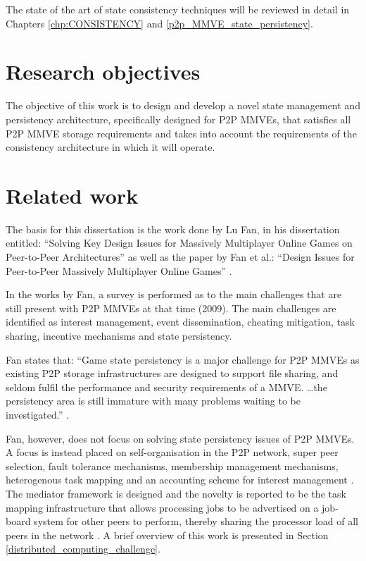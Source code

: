 The state of the art of state consistency techniques will be reviewed in detail in Chapters \ref{chp:CONSISTENCY} and \ref{p2p_MMVE_state_persistency}.

\section{Research objectives}

The objective of this work is to design and develop a novel state management and persistency architecture, specifically designed for P2P MMVEs, that satisfies all P2P MMVE storage requirements and takes into account the requirements of the consistency architecture in which it will operate.

\section{Related work}

The basis for this dissertation is the work done by Lu Fan, in his dissertation entitled: ``Solving Key Design Issues for Massively Multiplayer Online Games on Peer-to-Peer Architectures'' \cite{Fan_phd} as well as the paper by Fan et al.: ``Design Issues for Peer-to-Peer Massively Multiplayer Online Games'' \cite{Fan_deisgn_issues_p2p}.

In the works by Fan, a survey is performed as to the main challenges that are still present with P2P MMVEs at that time (2009). The main challenges are identified as interest management, event dissemination, cheating mitigation, task sharing, incentive mechanisms and state persistency.

Fan states that: ``Game state persistency is a major challenge for P2P MMVEs as existing P2P storage infrastructures are designed to support file sharing, and seldom fulfil the performance and security requirements of a MMVE. \ldots the persistency area is still immature with many problems waiting to be investigated.'' \cite{Fan_phd}.

Fan, however, does not focus on solving state persistency issues of P2P MMVEs. A focus is instead placed on self-organisation in the P2P network, super peer selection, fault tolerance mechanisms, membership management mechanisms, heterogenous task mapping and an accounting scheme for interest management \cite{Fan_phd}. The mediator framework is designed and the novelty is reported to be the task mapping infrastructure that allows processing jobs to be advertised on a job-board system for other peers to perform, thereby sharing the processor load of all peers in the network \cite{fan_mediator_paper}. A brief overview of this work is presented in Section \ref{distributed_computing_challenge}.


